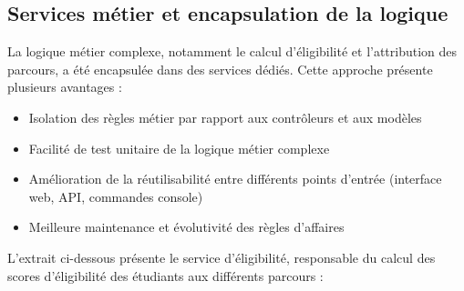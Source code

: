 \documentclass[french,12pt]{report} %
\begin{document}
\subsection{Services métier et encapsulation de la logique}

La logique métier complexe, notamment le calcul d'éligibilité et l'attribution des parcours, a été encapsulée dans des services dédiés. Cette approche présente plusieurs avantages :

\begin{itemize}
    \item Isolation des règles métier par rapport aux contrôleurs et aux modèles
    \item Facilité de test unitaire de la logique métier complexe
    \item Amélioration de la réutilisabilité entre différents points d'entrée (interface web, API, commandes console)
    \item Meilleure maintenance et évolutivité des règles d'affaires
\end{itemize}

L'extrait ci-dessous présente le service d'éligibilité, responsable du calcul des scores d'éligibilité des étudiants aux différents parcours :
\end{document}
